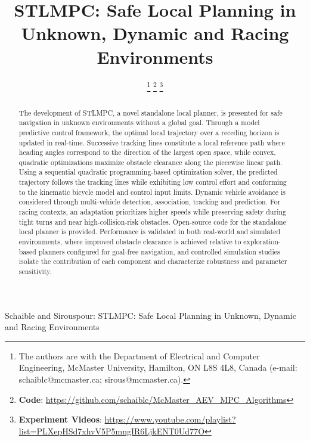 \documentclass[journal]{IEEEtran}
\begin{document}
\title{STLMPC: Safe Local Planning in\\Unknown, Dynamic and Racing Environments}

\author{
\thanks{The authors are with the Department of Electrical and Computer Engineering, McMaster University, Hamilton, ON L8S 4L8, Canada (e-mail: schaiblc@mcmaster.ca; sirous@mcmaster.ca).}
\thanks{\textbf{Code}: \url{https://github.com/schaiblc/McMaster_AEV_MPC_Algorithms}}
\thanks{\textbf{Experiment Videos}: \url{https://www.youtube.com/playlist?list=PLXepHSd7xhvV5P5mngIR6LjkENT0Ud77O}} 
}%

%
{Schaible and Sirouspour: STLMPC: Safe Local Planning in Unknown, Dynamic and Racing Environments}


\maketitle

\begin{abstract}
The development of STLMPC, a novel standalone local planner, is presented for safe navigation in unknown environments without a global goal. Through a model predictive control framework, the optimal local trajectory over a receding horizon is updated in real-time. Successive tracking lines constitute a local reference path where heading angles correspond to the direction of the largest open space, while convex, quadratic optimizations maximize obstacle clearance along the piecewise linear path. Using a sequential quadratic programming-based optimization solver, the predicted trajectory follows the tracking lines while exhibiting low control effort and conforming to the kinematic bicycle model and control input limits. Dynamic vehicle avoidance is considered through multi-vehicle detection, association, tracking and prediction. For racing contexts, an adaptation prioritizes higher speeds while preserving safety during tight turns and near high-collision-risk obstacles. Open-source code for the standalone local planner is provided. Performance is validated in both real-world and simulated environments, where improved obstacle clearance is achieved relative to exploration-based planners configured for goal-free navigation, and controlled simulation studies isolate the contribution of each component and characterize robustness and parameter sensitivity.
\end{abstract}
\end{document}
